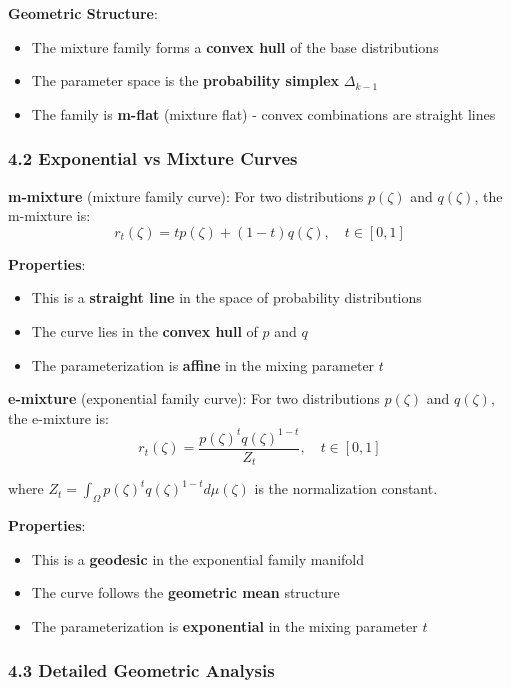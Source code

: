 \documentclass{amsart}
\theoremstyle{plain}
\theoremstyle{definition}
\theoremstyle{remark}
\begin{document}
\textbf{Geometric Structure}:

\begin{itemize}
	\item The mixture family forms a \textbf{convex hull} of the base distributions
	\item The parameter space is the \textbf{probability simplex} $\Delta_{k-1}$
	\item The family is \textbf{m-flat} (mixture flat) - convex combinations are straight lines
\end{itemize}

\subsubsection{4.2 Exponential vs Mixture Curves}

\textbf{m-mixture} (mixture family curve):
For two distributions $p(\zeta)$ and $q(\zeta)$, the m-mixture is:
\[
r_t(\zeta) = tp(\zeta) + (1-t)q(\zeta), \quad t \in [0,1]
\]

\textbf{Properties}:

\begin{itemize}
	\item This is a \textbf{straight line} in the space of probability distributions
	\item The curve lies in the \textbf{convex hull} of $p$ and $q$
	\item The parameterization is \textbf{affine} in the mixing parameter $t$
\end{itemize}

\textbf{e-mixture} (exponential family curve):
For two distributions $p(\zeta)$ and $q(\zeta)$, the e-mixture is:
\[
r_t(\zeta) = \frac{p(\zeta)^t q(\zeta)^{1-t}}{Z_t}, \quad t \in [0,1]
\]

where $Z_t = \int_{\Omega} p(\zeta)^t q(\zeta)^{1-t} d\mu(\zeta)$ is the normalization constant.

\textbf{Properties}:

\begin{itemize}
	\item This is a \textbf{geodesic} in the exponential family manifold
	\item The curve follows the \textbf{geometric mean} structure
	\item The parameterization is \textbf{exponential} in the mixing parameter $t$
\end{itemize}

\subsubsection{4.3 Detailed Geometric Analysis}
\end{document}
